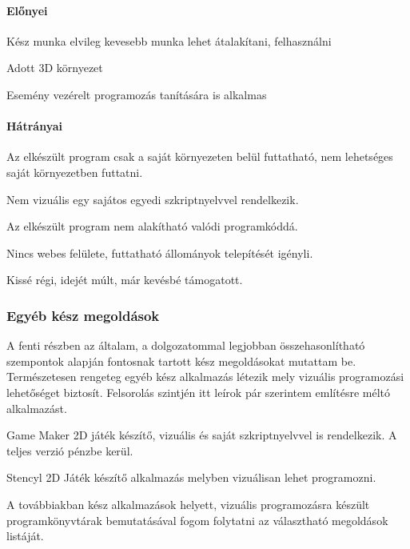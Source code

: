 \documentclass[12pt,a4paper,oneside]{report} %
\begin{document}
\paragraph{Előnyei} 
\begin{compactitem}
	\item Kész munka elvileg kevesebb munka lehet átalakítani, felhasználni
	\item Adott 3D környezet
	\item Esemény vezérelt programozás tanítására is alkalmas
\end{compactitem}
\paragraph{Hátrányai} 
\begin{compactitem}
	\item Az elkészült program csak a saját környezeten belül futtatható, nem lehetséges saját környezetben futtatni.
	\item Nem vizuális egy sajátos egyedi szkriptnyelvvel rendelkezik.
	\item Az elkészült program nem alakítható valódi programkóddá.
	\item Nincs webes felülete, futtatható állományok telepítését igényli.
	\item Kissé régi, idejét múlt, már kevésbé támogatott.
\end{compactitem}

\subsubsection{Egyéb kész megoldások}
A fenti részben az általam, a dolgozatommal legjobban összehasonlítható szempontok alapján fontosnak tartott kész megoldásokat mutattam be. Természetesen rengeteg egyéb kész alkalmazás létezik mely vizuális programozási lehetőséget biztosít. Felsorolás szintjén itt leírok pár szerintem említésre méltó alkalmazást. 
\begin{compactitem}
	\item Game Maker \cite{jenson2016exploring} 2D játék készítő, vizuális és saját szkriptnyelvvel is rendelkezik. A teljes verzió pénzbe kerül.
	\item Stencyl \cite{liu2014making} 2D Játék készítő alkalmazás melyben vizuálisan lehet programozni.
\end{compactitem}
A továbbiakban kész alkalmazások helyett, vizuális programozásra készült programkönyvtárak bemutatásával fogom folytatni az választható megoldások listáját.  
\end{document}
